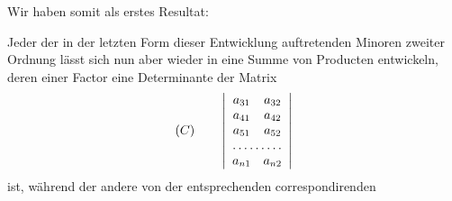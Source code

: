 Wir haben somit als erstes Resultat:

Jeder der in der letzten Form dieser Entwicklung auftretenden Minoren zweiter Ordnung lässt sich nun aber wieder in eine Summe von Producten entwickeln, deren einer Factor eine Determinante der Matrix
\[
(C)\qquad \left|\begin{array}{cc}
a_{31} & a_{32}\\
a_{41} & a_{42}\\
a_{51} & a_{52}\\
\hdotsfor{2}\\
a_{n1} & a_{n2}
\end{array}\right|
\]
ist, während der andere von der entsprechenden correspondirenden


